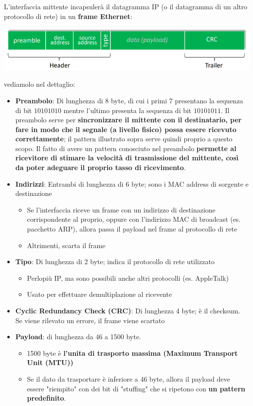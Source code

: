 \documentclass[12pt]{article}
\begin{document}
L'interfaccia mittente incapsulerà il datagramma IP (o il datagramma di un altro protocollo di rete) in un \textbf{frame Ethernet}:
\begin{center}
    \includegraphics[width =0.90\linewidth]{Images/137.png}
\end{center}
vediamolo nel dettaglio:
\begin{itemize}
    \item \textbf{Preambolo}: Di lunghezza di 8 byte, di cui i primi 7 presentano la sequenza di bit $10101010$ mentre l'ultimo presenta la sequenza di bit $10101011$.
    Il preambolo serve per \textbf{sincronizzare il mittente con il destinatario, per fare in modo che il segnale (a livello fisico) possa essere ricevuto correttamente}; il pattern illustrato sopra serve quindi proprio a questo scopo.
    Il fatto di avere un pattern conosciuto nel preambolo \textbf{permette al ricevitore di stimare la velocità di trasmissione del mittente, così da poter adeguare il proprio tasso di ricevimento}.
    \item \textbf{Indirizzi}: Entrambi di lunghezza di 6 byte; sono i MAC address di sorgente e destinazione
    \begin{itemize}
        \item Se l'interfaccia riceve un frame con un indirizzo di destinazione corrispondente al proprio, oppure con l'indirizzo MAC di broadcast (es. pacchetto ARP), allora passa il payload nel frame al protocollo di rete
        \item Altrimenti, scarta il frame
    \end{itemize}
    \item \textbf{Tipo}: Di lunghezza di 2 byte; indica il protocollo di rete utilizzato
    \begin{itemize}
        \item Perlopiù IP, ma sono possibili anche altri protocolli (es. AppleTalk)
        \item Usato per effettuare demultiplazione al ricevente
    \end{itemize}
    \item \textbf{Cyclic Redundancy Check (CRC)}: Di lunghezza 4 byte; è il checksum. Se viene rilevato un errore, il frame viene scartato
    \item \textbf{Payload}: di lunghezza da 46 a 1500 byte.
    \begin{itemize}
        \item 1500 byte è \textbf{l'unita di trasporto massima (Maximum Transport Unit (MTU))}
        \item Se il dato da trasportare è inferiore a 46 byte, allora il payload deve essere "riempito" con dei bit di "stuffing" che si ripetono con \textbf{un pattern predefinito}.
    \end{itemize}
\end{itemize}
\end{document}
